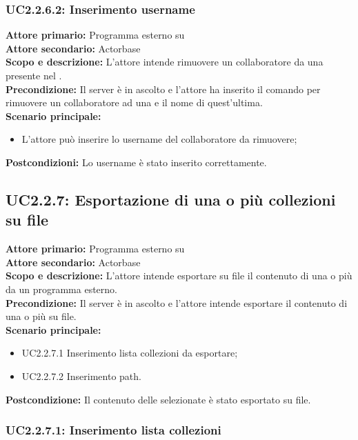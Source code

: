 \documentclass{scalatekids-article}
\begin{document}
\subsubsection{UC2.2.6.2: Inserimento username}

\textbf{Attore primario:} Programma esterno su \\
\textbf{Attore secondario:} Actorbase\\
\textbf{Scopo e descrizione:} L’attore intende rimuovere un collaboratore da una  presente nel .\\
\textbf{Precondizione:} Il server è in ascolto e l’attore ha inserito il comando per rimuovere un collaboratore ad una  e il nome di quest'ultima.\\
\textbf{Scenario principale:}
\begin{itemize}
\item L'attore può inserire lo username del collaboratore da rimuovere;
\end{itemize}
\textbf{Postcondizioni:} Lo username è stato inserito correttamente.

\subsection{UC2.2.7: Esportazione di una o più collezioni su file}

\textbf{Attore primario:} Programma esterno su \\
\textbf{Attore secondario:} Actorbase\\
\textbf{Scopo e descrizione:} L'attore intende esportare su file il contenuto di una o più  da un programma  esterno.\\
\textbf{Precondizione:} Il server è in ascolto e l'attore intende esportare il contenuto di una o più  su file.\\
\textbf{Scenario principale:}
\begin{itemize}
\item UC2.2.7.1 Inserimento lista collezioni da esportare;
\item UC2.2.7.2 Inserimento path.
\end{itemize}
\textbf{Postcondizione:} Il contenuto delle  selezionate è stato esportato su file.

\subsubsection{UC2.2.7.1: Inserimento lista collezioni}
\end{document}
